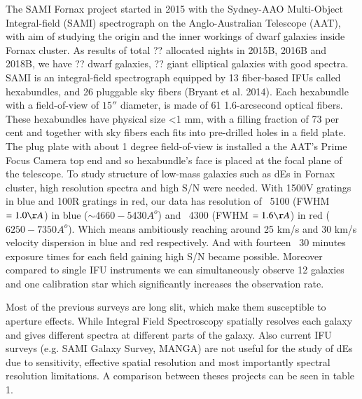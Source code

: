 \documentclass{aa}
\begin{document}
The SAMI Fornax project started in 2015 with the Sydney-AAO Multi-Object Integral-field (SAMI) spectrograph on the Anglo-Australian Telescope (AAT), with aim of studying the origin and the inner workings of dwarf galaxies inside Fornax cluster. As results of total ?? allocated nights in 2015B, 2016B and 2018B, we have ?? dwarf galaxies, ?? giant elliptical galaxies with good spectra.\\
SAMI is an integral-field spectrograph equipped by 13 fiber-based IFUs called hexabundles, and 26 pluggable sky fibers (Bryant et al. 2014). Each hexabundle with a field-of-view of $15''$ diameter, is made of 61 1.6-arcsecond optical fibers. These hexabundles have physical size <1 mm, with a filling fraction of 73 per cent and together with sky fibers each fits into pre-drilled holes in a field plate. The plug plate with about 1 degree field-of-view is installed a the AAT's Prime Focus Camera top end and so hexabundle's face is placed at the focal plane of the telescope. 
To study structure of low-mass galaxies such as dEs in Fornax cluster, high resolution spectra and high S/N were needed. With 1500V gratings in blue and 100R gratings in red, our data has resolution of ~5100 (FWHM $= 1.0 \AA$) in blue ($\sim4660-5430A^o$) and ~4300 (FWHM $= 1.6 \AA$) in red ($6250-7350A^o$). Which means ambitiously reaching around 25 km/s and 30 km/s velocity dispersion in blue and red respectively. And with fourteen ~30 minutes exposure times for each field gaining high S/N became possible. Moreover compared to single IFU instruments we can simultaneously observe 12 galaxies and one calibration star which significantly increases the observation rate.

Most of the previous surveys are long slit, which make them susceptible to aperture
effects. While Integral Field Spectroscopy spatially resolves each galaxy and gives
different spectra at different parts of the galaxy. Also current IFU surveys (e.g.
SAMI Galaxy Survey, MANGA) are not useful for the study of dEs due to sensitivity, effective spatial resolution and most importantly spectral resolution limitations. A comparison between theses projects can be seen in table 1.
\end{document}
